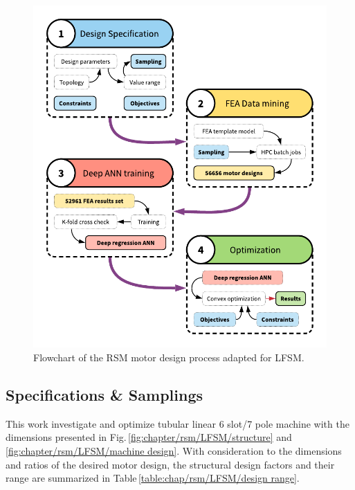     
        \begin{figure}
            \centering
            \includegraphics[width=4.5in]{chap4/images2/LFSM_design_process.pdf}
            \caption{Flowchart of the RSM motor design process adapted for \acs{LFSM}.}
            \label{fig:chapter/rsm/LFSM/design process}
        \end{figure}
    
    
        \subsection{Specifications \& Samplings}    \label{Chapter:RSM/LFSM/spec}
        
        
            This work investigate and optimize tubular linear 6 slot/7 pole machine with the dimensions presented in Fig.\,\ref{fig:chapter/rsm/LFSM/structure} and \,\ref{fig:chapter/rsm/LFSM/machine design}. With consideration to the dimensions and ratios of the desired motor design, the structural design factors and their range are summarized in Table\,\ref{table:chap/rsm/LFSM/design range}. 
            
